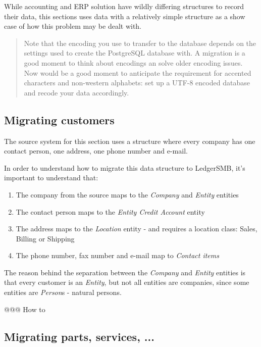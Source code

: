While accounting and ERP solution have wildly differing structures to record their
data, this sections uses data with a relatively simple structure as a show case of
how this problem may be dealt with.

\begin{quote}
Note that the encoding you use to transfer to the database depends on the settings
used to create the PostgreSQL database with.  A migration is a good moment to think
about encodings an solve older encoding issues.  Now would be a good moment to
anticipate the requirement for accented characters and non-western alphabets: set up
a UTF-8 encoded database and recode your data accordingly.
\end{quote}

\subsection{Migrating customers}
\label{subsec-migration-others-customers}

The source system for this section uses a structure where every company has one
contact person, one address, one phone number and e-mail.

In order to understand how to migrate this data structure to LedgerSMB, it's
important to understand that:

\begin{enumerate}
\item The company from the source maps to the \emph{Company} and \emph{Entity} entities
\item The contact person maps to the \emph{Entity Credit Account} entity
\item The address maps to the \emph{Location} entity - and requires a location class: Sales, Billing or Shipping
\item The phone number, fax number and e-mail map to \emph{Contact items}
\end{enumerate}

The reason behind the separation between the \emph{Company} and \emph{Entity} entities
is that every customer is an \emph{Entity}, but not all entities are companies, since
some entities are \emph{Person}s - natural persons.

@@@ How to

\subsection{Migrating parts, services, ...}
\label{subsec-migration-others-products}

